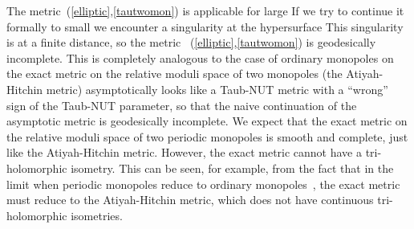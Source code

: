 \documentclass[a4paper,12pt, amsfonts, amssymb]{article}
\providecommand{\RR}{{\mathbb R}}
\providecommand{\ra}{\rightarrow}
\providecommand{\vr}{v_{{\rm ren}}}
\begin{document}
The metric~(\ref{elliptic},\ref{tautwomon}) is applicable for large
\coordHE{} If we try to continue it formally to small \coordHE{} we encounter
a singularity at the hypersurface \coordHE{} This singularity is
at a finite distance, so the metric ~(\ref{elliptic},\ref{tautwomon})
is geodesically incomplete. This is completely analogous to the
case of ordinary monopoles on \myHighlight{$\RR^3:$}\coordHE{} the exact metric on the relative
moduli space of two monopoles (the Atiyah-Hitchin metric) asymptotically
looks like a Taub-NUT metric with a ``wrong'' sign of the Taub-NUT parameter,
so that the naive continuation of the asymptotic metric is geodesically
incomplete. We expect that the exact metric on the relative
moduli space of two periodic monopoles is smooth and complete, just like
the Atiyah-Hitchin metric. However, the exact metric cannot have a
tri-holomorphic \coordHE{} isometry. This can be seen, for example, from the
fact that in the limit \myHighlight{$\vr\ra\infty,$}\coordHE{} when periodic monopoles
reduce to ordinary monopoles~\cite{ustwo}, the exact metric must reduce
to the Atiyah-Hitchin metric, which does not have continuous
tri-holomorphic isometries.
\end{document}
